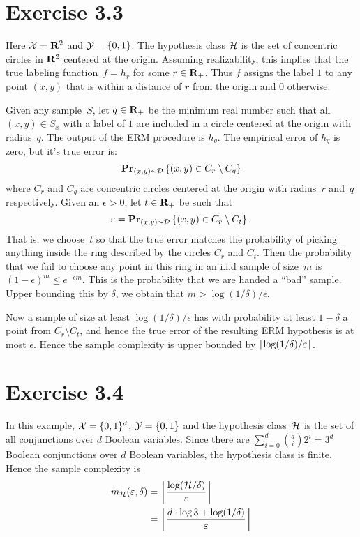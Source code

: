 \section*{Exercise 3.3}

Here $\mathcal{X} = \mathbf{R}^2$ and $\mathcal{Y} = \{0, 1\}$. The hypothesis class $\mathcal{H}$
is the set of concentric circles in $\mathbf{R}^2$ centered at the origin. Assuming
realizability, this implies that the true labeling function~$f = h_r$ for some
$r \in \mathbf{R}_{+}$. Thus $f$ assigns the label $1$ to any point $(x, y) $ that is
within a distance of $r$ from the origin and $0$ otherwise.

Given any sample~$S$, let $q \in \mathbf{R}_{+}$ be the minimum real number such that
all $(x, y) \in S_x$ with a label of $1$ are included in a circle centered at
the origin with radius~$q$. The output of the ERM procedure is $h_q$. The
empirical error of $h_q$ is zero, but it's true error is:
\[
	\mathbf{Pr}_{(x, y) \sim \mathcal{D}} \left \{ (x, y) \in C_r \setminus C_q \right \}
\]
where $C_r$ and $C_q$ are concentric circles centered at the origin with
radius~$r$ and~$q$ respectively. Given an $\epsilon > 0$, let $t \in \mathbf{R}_{+}$ be
such that $$\varepsilon = \mathbf{Pr}_{(x, y) \sim \mathcal{D}} \left \{ (x, y) \in C_r \setminus
C_t \right \}.$$ That is, we choose~$t$ so that the true error matches the probability
of picking anything inside the ring described by the circles $C_r$ and $C_t$.
Then the probability that we fail to choose any point in this ring in an i.i.d
sample of size~$m$ is $(1 - \epsilon)^m \leq e^{- \epsilon m}$. This is the
probability that we are handed a ``bad'' sample. Upper bounding this by
$\delta$, we obtain that $m > \log(1 / \delta) / \epsilon$.

Now a sample of size at least $\log(1 / \delta) / \epsilon$ has with
probability at least $1 - \delta$ a point from $C_r \setminus C_t$, and hence
the true error of the resulting ERM hypothesis is at most $\epsilon$. Hence the
sample complexity is upper bounded by $\left \lceil \log(1 / \delta) / \varepsilon \right \rceil$.

\section*{Exercise 3.4}

In this example, $\mathcal{X} = \{0, 1\}^d$, $\mathcal{Y} = \{0, 1\}$ and the hypothesis
class~$\mathcal{H}$ is the set of all conjunctions over $d$ Boolean variables.
Since there are $\sum_{i = 0}^{d} {d \choose i} 2^i = 3^{d}$ Boolean
conjunctions over $d$ Boolean variables, the hypothesis class is finite. Hence
the sample complexity is
\begin{align*}
	m_{\mathcal{H}}(\varepsilon, \delta) & = \left \lceil \frac{\log (\mathcal{H} / \delta)}{\varepsilon} \right \rceil \\
	& = \left \lceil \frac{d \cdot \log 3 + \log (1 / \delta)}{\varepsilon} \right \rceil
\end{align*}

